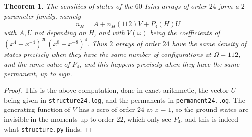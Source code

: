 \documentclass[11pt,a4paper]{article}
\newtheorem{thm}{Theorem}[section]
\theoremstyle{remark}
\begin{document}
\begin{samepage}
\begin{thm}\label{thm:order24}
The densities of states of the $60$ Ising arrays of order $24$ form a $2$-parameter family, namely
\[
 n_H=A+n_H(112)V+P_4(H)U
\]
with $A,U$ not depending on $H$, and with $V(\omega)$ being the coefficients of $(x^4-x^{-4})^{20}(x^8-x^{-8})^4$. Thus $2$ arrays of order $24$ have the same density of states precisely when they have the same number of configurations at $\Omega=112$, and the same value of $P_4$, and this happens precisely when they have the same permanent, up to sign.
\end{thm}
\end{samepage}

\begin{proof}
This is the above computation, done in exact arithmetic, the vector $U$ being given in \texttt{structure24.log}, and the permanents in \texttt{permanent24.log}. The generating function of $V$ has a zero of order $24$ at $x=1$, so the ground states are invisible in the moments up to order $22$, which only see $P_4$, and this is indeed what \texttt{structure.py} finds.
\end{proof}

\medskip
\end{document}
